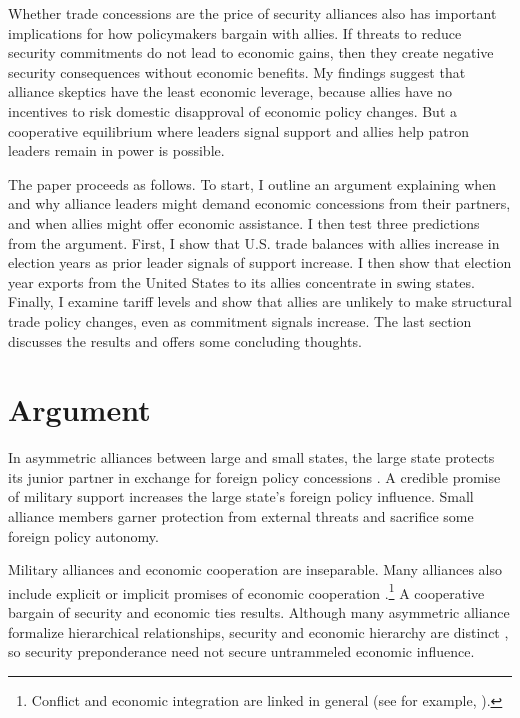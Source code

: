 \documentclass[12pt]{article}
\begin{document}
Whether trade concessions are the price of security alliances also has important implications for how policymakers bargain with allies. 
If threats to reduce security commitments do not lead to economic gains, then they create negative security consequences without economic benefits. 
My findings suggest that alliance skeptics have the least economic leverage, because allies have no incentives to risk domestic disapproval of economic policy changes.
But a cooperative equilibrium where leaders signal support and allies help patron leaders remain in power is possible. 


The paper proceeds as follows. 
To start, I outline an argument explaining when and why alliance leaders might demand economic concessions from their partners, and when allies might offer economic assistance. 
I then test three predictions from the argument. 
First, I show that U.S. trade balances with allies increase in election years as prior leader signals of support increase. 
I then show that election year exports from the United States to its allies concentrate in swing states. 
Finally, I examine tariff levels and show that allies are unlikely to make structural trade policy changes, even as commitment signals increase. 
The last section discusses the results and offers some concluding thoughts.


\section{Argument}


In asymmetric alliances between large and small states, the large state protects its junior partner in exchange for foreign policy concessions \citep{Morrow1991}.
A credible promise of military support increases the large state's foreign policy influence. 
Small alliance members garner protection from external threats and sacrifice some foreign policy autonomy. 


Military alliances and economic cooperation are inseparable.
Many alliances also include explicit or implicit promises of economic cooperation \citep{GowaMansfield2004, LongLeeds2006, Davis2008, Poast2012}.\footnote{Conflict and economic integration are linked in general (see for example, \citep{GartzkeLi2003, Chen2021}).}
A cooperative bargain of security and economic ties results. 
Although many asymmetric alliance formalize hierarchical relationships, security and economic hierarchy are distinct \citep{Lake2009}, so security preponderance need not secure untrammeled economic influence. 
\end{document}
